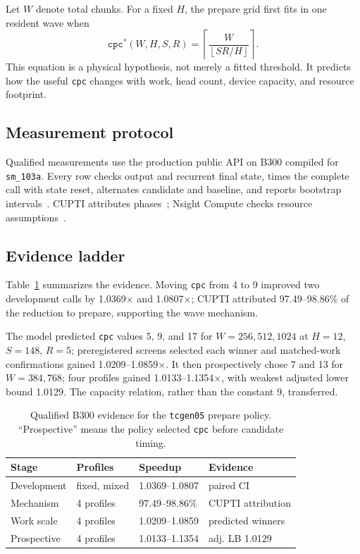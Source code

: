 \documentclass[11pt]{article}
\newcommand{\tcgen}{\texttt{tcgen05}}
\newcommand{\cpc}{\texttt{cpc}}
\begin{document}
Let $W$ denote total chunks. For a fixed $H$, the prepare grid first fits in one resident wave when
\[
\cpc^*(W,H,S,R)=
\left\lceil
\frac{W}{\left\lfloor SR/H\right\rfloor}
\right\rceil .
\]
This equation is a physical hypothesis, not merely a fitted threshold. It predicts how the useful \cpc{} changes with work, head count, device capacity, and resource footprint.

\subsection{Measurement protocol}

Qualified measurements use the production public API on B300 compiled for \texttt{sm\_103a}. Every row checks output and recurrent final state, times the complete call with state reset, alternates candidate and baseline, and reports bootstrap intervals~\citep{efron1994bootstrap}. CUPTI attributes phases~\citep{cupti2026}; Nsight Compute checks resource assumptions~\citep{nsightcompute2026}.

\subsection{Evidence ladder}

Table~\ref{tab:qualified} summarizes the evidence. Moving \cpc{} from 4 to 9 improved two development calls by 1.0369$\times$ and 1.0807$\times$; CUPTI attributed 97.49--98.86\% of the reduction to prepare, supporting the wave mechanism.

The model predicted \cpc{} values 5, 9, and 17 for $W=256,512,1024$ at $H=12$, $S=148$, $R=5$; preregistered screens selected each winner and matched-work confirmations gained 1.0209--1.0859$\times$. It then prospectively chose 7 and 13 for $W=384,768$; four profiles gained 1.0133--1.1354$\times$, with weakest adjusted lower bound 1.0129. The capacity relation, rather than the constant 9, transferred.

\begin{table}[t]
\centering
\caption{Qualified B300 evidence for the \tcgen{} prepare policy. ``Prospective'' means the policy selected \cpc{} before candidate timing.}
\label{tab:qualified}
\small
\setlength{\tabcolsep}{4pt}
\begin{tabular}{@{}p{}p{}p{}p{}@{}}
\toprule
Stage & Profiles & Speedup & Evidence \\
\midrule
Development & fixed, mixed & 1.0369--1.0807 & paired CI \\
Mechanism & 4 profiles & 97.49--98.86\% & CUPTI attribution \\
Work scale & 4 profiles & 1.0209--1.0859 & predicted winners \\
Prospective & 4 profiles & 1.0133--1.1354 & adj. LB 1.0129 \\
\bottomrule
\end{tabular}
\end{table}
\end{document}
